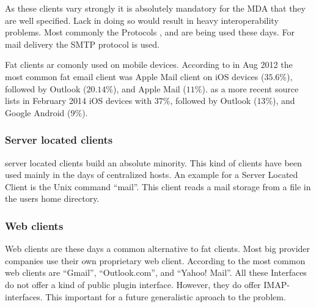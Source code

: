 As these clients vary strongly it is absolutely mandatory for the MDA that they are well specified. Lack in doing so would result in heavy interoperability problems. Most commonly the Protocols ,  and  are being used these days. For mail delivery the SMTP protocol is used. \par

Fat clients ar comonly used on mobile devices. According to  \cite{clientDistribution} in Aug 2012 the most common fat email client was Apple Mail client on iOS devices ($35.6\%$), followed by Outlook ($20.14\%$), and Apple Mail ($11\%$). \cite{clientDistribution2} as a more recent source lists in February 2014 iOS devices with $37\%$, followed by Outlook ($13\%$), and  Google Android ($9\%$).

\subsubsection{Server located clients}
server located clients build an absolute minority. This kind of clients have been used mainly in the days of centralized hosts. An example for a Server Located Client is the Unix command "`mail"'. This client reads a mail storage from a file in the users home directory.

\subsubsection{Web clients}
Web clients are these days a common alternative to fat clients. Most big provider companies use their own proprietary web client. According to \cite{clientDistribution2} the most common web clients are "`Gmail"', "`Outlook.com"', and "`Yahoo! Mail"'. All these Interfaces do not offer a kind of public plugin interface. However,  they do offer IMAP-interfaces. This important for a future generalistic aproach to the problem.

